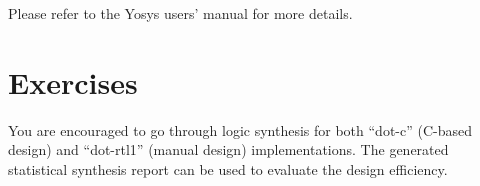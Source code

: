 \documentclass[12pt]{article}
\newcommand{\quotes}[1]{``#1''}
\begin{document}
Please refer to the Yosys users' manual for more details.

\section{Exercises}

You are encouraged to go through logic synthesis for both
\quotes{dot-c} (C-based design) and \quotes{dot-rtl1} (manual design)
implementations. The generated statistical synthesis report can be
used to evaluate the design efficiency.
\end{document}
